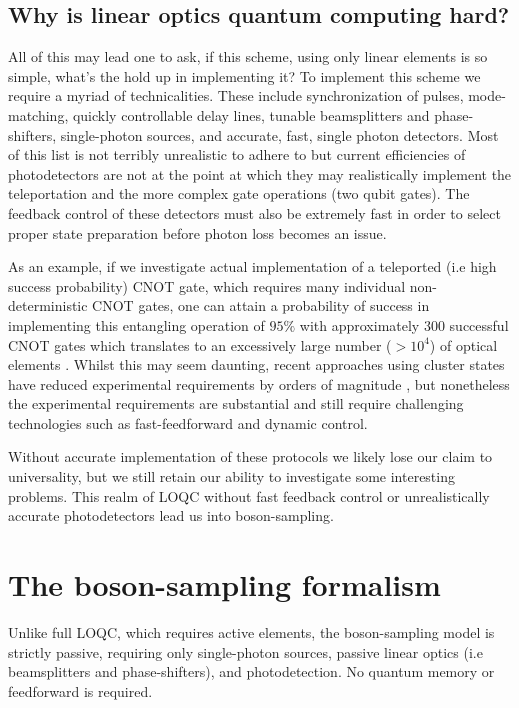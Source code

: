 \documentclass[aps,pra,twocolumn,amsmath,amssymb,nofootinbib,superscriptaddress]{revtex4}
\begin{document}
\subsection{Why is linear optics quantum computing hard?}

All of this may lead one to ask, if this scheme, using only linear elements is so simple, what's the hold up in implementing it? To implement this scheme we require a myriad of technicalities. These include synchronization of pulses, mode-matching, quickly controllable delay lines, tunable beamsplitters and phase-shifters, single-photon sources, and accurate, fast, single photon detectors. Most of this list is not terribly unrealistic to adhere to but current efficiencies of photodetectors are not at the point at which they may realistically implement the teleportation and the more complex gate operations (two qubit gates). The feedback control of these detectors must also be extremely fast in order to select proper state preparation before photon loss becomes an issue.

As an example, if we investigate actual implementation of a teleported (i.e high success probability) CNOT gate, which requires many individual non-deterministic CNOT gates, one can attain a probability of success in implementing this entangling operation of $95\%$ with approximately 300 successful CNOT gates which translates to an excessively large number ($>10^4$) of optical elements \cite{nielsen2}. Whilst this may seem daunting, recent approaches using cluster states have reduced experimental requirements by orders of magnitude \cite{bib:Nielsen04, bib:BrowneRudolph05}, but nonetheless the experimental requirements are substantial and still require challenging technologies such as fast-feedforward and dynamic control.

Without accurate implementation of these protocols we likely lose our claim to universality, but we still retain our ability to investigate some interesting problems. This realm of LOQC without fast feedback control or unrealistically accurate photodetectors lead us into boson-sampling.

\section{The boson-sampling formalism}

Unlike full LOQC, which requires active elements, the boson-sampling model is strictly passive, requiring only single-photon sources, passive linear optics (i.e beamsplitters and phase-shifters), and photodetection. No quantum memory or feedforward is required.
\end{document}
